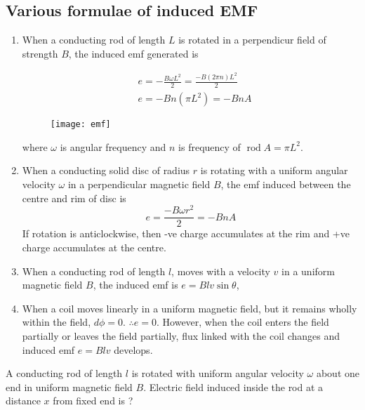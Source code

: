\subsection{ Various formulae of induced EMF}
\begin{enumerate}
	\item  When a conducting rod of length $L$ is rotated in a perpendicur field of strength $B$, the induced emf generated is
	\begin{minipage}{0.5\textwidth}
	$$
	\begin{aligned}
	&e=-\frac{B \omega L^{2}}{2}=\frac{-B(2 \pi n) L^{2}}{2} \\
	&e=-B n\left(\pi L^{2}\right)=-B n A
	\end{aligned}
	$$
	\end{minipage}
\begin{minipage}{0.5\textwidth}
	\begin{figure}[H]
	\begin{center}
		\texttt{[image: emf]}
	\end{center}
\end{figure}
\end{minipage}
	where $\omega$ is angular frequency and $n$ is frequency of $\operatorname{rod} A=\pi L^{2}$.
	\item When a conducting solid disc of radius $r$ is rotating with a uniform angular velocity $\omega$ in a perpendicular magnetic field $B$, the emf induced between the centre and rim of disc is
	$$
	e=\frac{-B \omega r^{2}}{2}=-B n A
	$$
	If rotation is anticlockwise, then -ve charge accumulates at the rim and +ve charge accumulates at the centre.
	\item When a conducting rod of length $l$, moves with a velocity $v$ in a uniform magnetic field $B$, the induced emf is $e=B l v \sin \theta$,
	\item When a coil moves linearly in a uniform magnetic field, but it remains wholly within the field, $d \phi=0$. $\therefore e=0 .$ However, when the coil enters the field partially or leaves the field partially, flux linked with the coil changes and induced emf $e=B l v$ develops.
\end{enumerate}
\begin{exercise}
	A conducting rod of length $l$ is rotated with uniform angular velocity $\omega$ about one end in uniform magnetic field $B$. Electric field induced inside the rod at a distance $x$ from fixed end is ?
\end{exercise}
